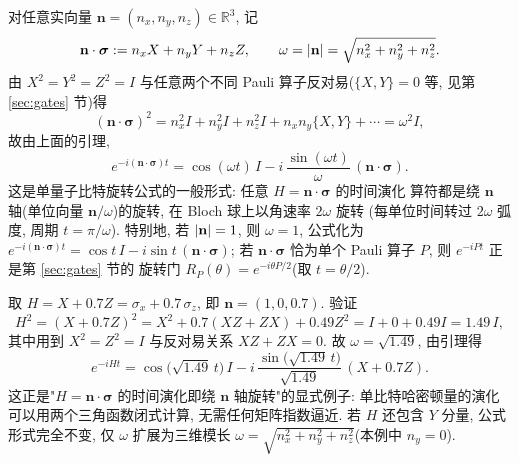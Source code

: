 \documentclass[utf8]{article} %
\numberwithin{equation}{section}   %
\newtheorem{Cor}{\hskip 2em {\color{cyan} 推论}}[subsection]
\newtheorem{Eg}{\hskip 2em {\color{black} 例}}[subsection]
\begin{document}
\begin{Cor}[泡利向量旋转公式]
    对任意实向量 $\mathbf{n} = (n_x, n_y, n_z) \in \mathbb{R}^3$, 记
    \[ \mathbf{n} \cdot \boldsymbol{\sigma} := n_x X + n_y Y + n_z Z, \qquad
       \omega = \abs{\mathbf{n}} = \sqrt{n_x^2 + n_y^2 + n_z^2}. \]
    由 $X^2 = Y^2 = Z^2 = I$ 与任意两个不同 Pauli 算子反对易($\{X, Y\} = 0$ 等, 见第 \ref{sec:gates} 节)得
    \begin{equation}
        (\mathbf{n} \cdot \boldsymbol{\sigma})^2
        = n_x^2 I + n_y^2 I + n_z^2 I + n_x n_y\{X,Y\} + \cdots = \omega^2 I,
    \end{equation}
    故由上面的引理,
    \begin{equation}
        e^{-i(\mathbf{n} \cdot \boldsymbol{\sigma}) t}
        = \cos(\omega t)\, I - i\,\frac{\sin(\omega t)}{\omega}\, (\mathbf{n} \cdot \boldsymbol{\sigma}).
        \label{eq:pauli_rot}
    \end{equation}
    这是单量子比特旋转公式的一般形式: 任意 $H = \mathbf{n}\cdot\boldsymbol{\sigma}$ 的时间演化
    算符都是绕 $\mathbf{n}$ 轴(单位向量 $\mathbf{n}/\omega$)的旋转, 在 Bloch 球上以角速率 $2\omega$ 旋转
    (每单位时间转过 $2\omega$ 弧度, 周期 $t = \pi/\omega$).
    特别地, 若 $\abs{\mathbf{n}} = 1$, 则 $\omega = 1$, 公式化为
    $e^{-i(\mathbf{n}\cdot\boldsymbol{\sigma})t} = \cos t\, I - i\sin t\,(\mathbf{n}\cdot\boldsymbol{\sigma})$;
    若 $\mathbf{n}\cdot\boldsymbol{\sigma}$ 恰为单个 Pauli 算子 $P$, 则 $e^{-iPt}$ 正是第 \ref{sec:gates} 节的
    旋转门 $R_P(\theta) = e^{-i\theta P/2}$(取 $t = \theta/2$).
\end{Cor}

\begin{Eg}[$H = X + 0.7Z$ 的时间演化]
    取 $H = X + 0.7Z = \sigma_x + 0.7\,\sigma_z$, 即 $\mathbf{n} = (1, 0, 0.7)$. 验证
    \begin{equation*}
        H^2 = (X + 0.7Z)^2 = X^2 + 0.7(XZ + ZX) + 0.49 Z^2 = I + 0 + 0.49 I = 1.49\, I,
    \end{equation*}
    其中用到 $X^2 = Z^2 = I$ 与反对易关系 $XZ + ZX = 0$. 故 $\omega = \sqrt{1.49}$, 由引理得
    \begin{equation}
        e^{-iHt} = \cos\big(\sqrt{1.49}\,t\big)\, I
        - i\,\frac{\sin\big(\sqrt{1.49}\,t\big)}{\sqrt{1.49}}\,(X + 0.7Z).
    \end{equation}
    这正是"$H = \mathbf{n}\cdot\boldsymbol{\sigma}$ 的时间演化即绕 $\mathbf{n}$ 轴旋转"的显式例子:
    单比特哈密顿量的演化可以用两个三角函数闭式计算, 无需任何矩阵指数逼近.
    若 $H$ 还包含 $Y$ 分量, 公式形式完全不变, 仅 $\omega$ 扩展为三维模长
    $\omega = \sqrt{n_x^2 + n_y^2 + n_z^2}$(本例中 $n_y = 0$).
\end{Eg}
\end{document}
